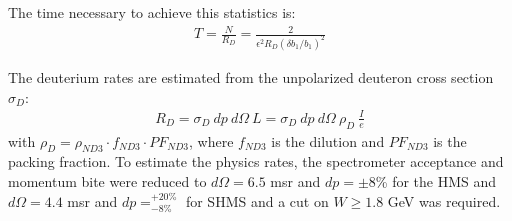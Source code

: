 The time necessary to achieve this statistics is:
\begin{eqnarray}
T = \frac{N}{R_D} = \frac{2}{\epsilon^2 R_D (\delta b_1 / b_1)^2}
\label{none} 
\end{eqnarray}

The deuterium rates are estimated from the unpolarized deuteron cross section~\cite{Martin:2009iq} $\sigma_D$:
\begin{eqnarray}
 R_D = \sigma_D~dp~d\Omega~L = \sigma_D~dp~d\Omega~\rho_D~\frac{I}{e}
\label{none} 
\end{eqnarray}
%
with $\rho_D = \rho_{ND3} \cdot f_{ND3} \cdot PF_{ND3}$, where $f_{ND3}$ is the dilution and $PF_{ND3}$ is the packing fraction. To estimate the physics rates, the spectrometer acceptance and momentum bite were reduced to $d\Omega = 6.5$ msr and $dp = \pm$8\% for the HMS and $d\Omega = 4.4$ msr and $dp = ^{+20\%} _{-8\%}$ for SHMS and a cut on $W \ge 1.8$ GeV was required.



